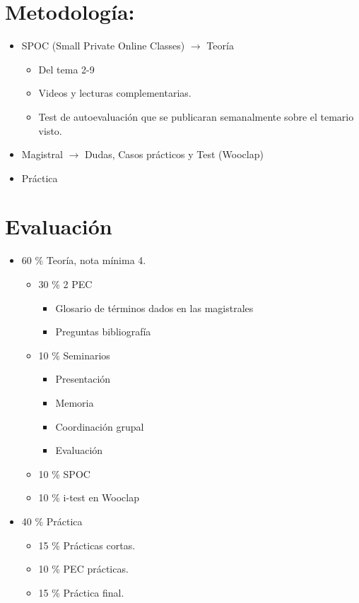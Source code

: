 \documentclass[12pt, twoside, openright]{report} %
\begin{document}
\section{Metodología:}
\begin{itemize}
	\item SPOC (Small Private Online Classes) $\rightarrow$ Teoría
	      \begin{itemize}
		      \item Del tema 2-9
		      \item Videos y lecturas complementarias.
		      \item Test de autoevaluación que se publicaran semanalmente sobre el temario visto.
	      \end{itemize}
	\item Magistral $\rightarrow$ Dudas, Casos prácticos y Test (Wooclap)
	\item Práctica
\end{itemize}

\section{Evaluación}
\begin{itemize}
	\item 60 \% Teoría, nota mínima 4.
	      \begin{itemize}
		      \item 30 \% 2 PEC
		            \begin{itemize}
			            \item Glosario de términos dados en las magistrales
			            \item Preguntas bibliografía
		            \end{itemize}
		      \item 10 \% Seminarios
		            \begin{itemize}
			            \item Presentación
			            \item Memoria
			            \item Coordinación grupal
			            \item Evaluación
		            \end{itemize}
		      \item 10 \% SPOC
		      \item 10 \% i-test en Wooclap
	      \end{itemize}
	\item 40 \% Práctica
	      \begin{itemize}
		      \item 15 \% Prácticas cortas.
		      \item 10 \% PEC prácticas.
		      \item 15 \% Práctica final.
	      \end{itemize}

\end{itemize}
\end{document}
